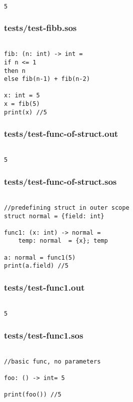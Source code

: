 \documentclass[main.tex]{subfiles}
\begin{document}
\begin{lstlisting}

5
\end{lstlisting}

\subsubsection{tests/test-fibb.sos}

\begin{lstlisting}

fib: (n: int) -> int = 
if n <= 1
then n
else fib(n-1) + fib(n-2)

x: int = 5
x = fib(5)
print(x) //5
\end{lstlisting}

\subsubsection{tests/test-func-of-struct.out}

\begin{lstlisting}

5
\end{lstlisting}

\subsubsection{tests/test-func-of-struct.sos}

\begin{lstlisting}

//predefining struct in outer scope
struct normal = {field: int}

func1: (x: int) -> normal = 
    temp: normal  = {x}; temp

a: normal = func1(5)
print(a.field) //5
\end{lstlisting}

\subsubsection{tests/test-func1.out}

\begin{lstlisting}

5
\end{lstlisting}

\subsubsection{tests/test-func1.sos}

\begin{lstlisting}

//basic func, no parameters

foo: () -> int= 5

print(foo()) //5
\end{lstlisting}
\end{document}
